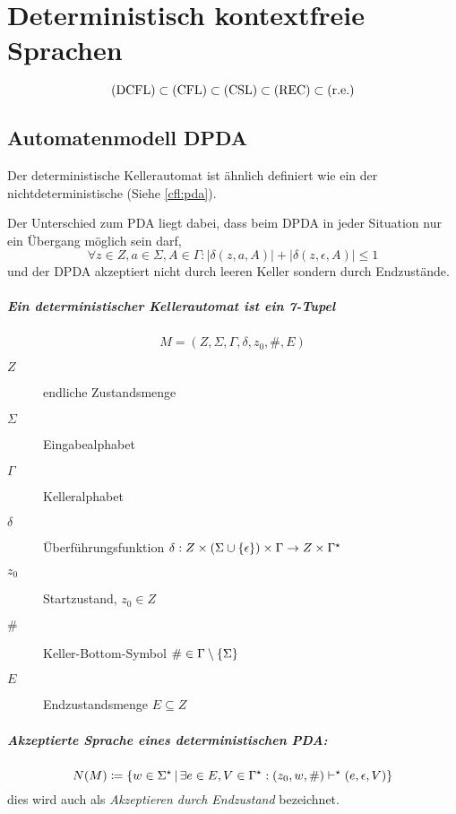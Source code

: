 \chapter{Deterministisch kontextfreie Sprachen}
\begin{equation*}
	\mathrm{(DCFL)}\subset\mathrm{(CFL)}\subset\mathrm{(CSL)}\subset\mathrm{(REC)}\subset\mathrm{(r.e.)}
\end{equation*}

\section{Automatenmodell DPDA}\label{dcfl:dpda}
Der deterministische Kellerautomat ist ähnlich definiert wie ein der nichtdeterministische (Siehe \autoref{cfl:pda}).

Der Unterschied zum PDA liegt dabei, dass beim DPDA in jeder Situation nur ein Übergang möglich sein darf,
\begin{equation*}
	\forall z\in Z, a\in\Sigma, A\in\Gamma : |\delta(z,a,A)|+|\delta(z,\epsilon,A)|\leq 1
\end{equation*}
und der DPDA akzeptiert nicht durch leeren Keller sondern durch Endzustände.

\paragraph{Ein deterministischer Kellerautomat ist ein 7-Tupel}
\begin{equation*}
	M=(Z,\Sigma,\Gamma,\delta,z_0,\#, E)
\end{equation*}
\begin{description}
	\item[$Z$] endliche Zustandsmenge
	\item[$\Sigma$] Eingabealphabet
	\item[$\Gamma$] Kelleralphabet
	\item[$\delta$] Überführungsfunktion $\delta:Z\times(\Sigma\cup\left\{ \epsilon \right\})\times\Gamma \rightarrow Z\times\Gamma^\star$
	\item[$z_0$] Startzustand, $z_0\in Z$
	\item[$\#$] Keller-Bottom-Symbol $\#\in \Gamma\setminus\left\{ \Sigma \right\}$
	\item[$E$] Endzustandsmenge $E\subseteq Z$
\end{description}

\paragraph{Akzeptierte Sprache eines deterministischen PDA:}
\begin{equation*}
	N(M)\coloneqq\left\{ w\in \Sigma^\star \,\middle|\, \exists e\in E, V\in \Gamma^\star: (z_0, w, \#)\vdash^\star (e,\epsilon,V) \right\}
\end{equation*}
dies wird auch als \emph{Akzeptieren durch Endzustand} bezeichnet.

